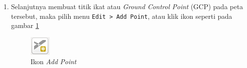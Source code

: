 \begin{enumerate}[1.]
  \item Selanjutnya membuat titik ikat atau \textit{Ground Control Point} (GCP) pada peta tersebut, maka pilih menu \verb|Edit > Add Point|, atau klik ikon seperti pada gambar \ref{fig:addpointicon}
  
  \begin{figure}[H]
    \centering
    \includegraphics[scale=1]{./resources/027-add-point-icon}
    \caption{Ikon \textit{Add Point}}
    \label{fig:addpointicon}
  \end{figure}
  
\end{enumerate}